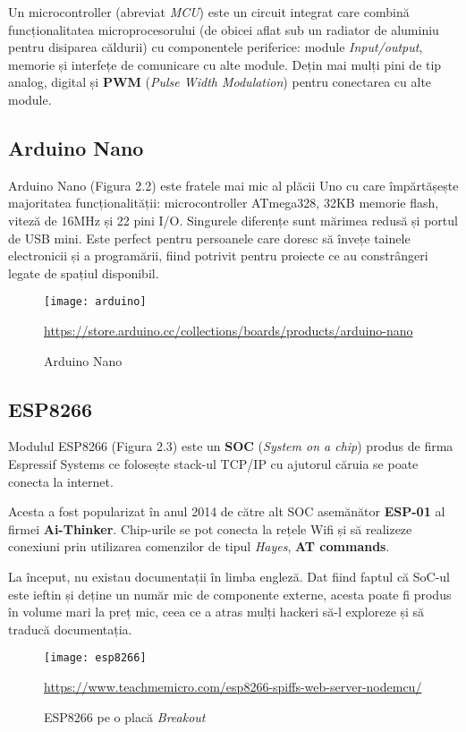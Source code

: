 Un microcontroller (abreviat \emph{MCU}) este un circuit integrat care combină funcționalitatea microprocesorului (de obicei aflat sub un radiator de aluminiu pentru disiparea căldurii) cu componentele periferice: module \emph{Input/output}, memorie și interfețe de comunicare cu alte module. Dețin mai mulți pini de tip analog, digital și \textbf{PWM} (\emph{Pulse Width Modulation}) pentru conectarea cu alte module.

\break

\subsection{Arduino Nano}

Arduino Nano (Figura 2.2) este fratele mai mic al plăcii Uno cu care împărtășește majoritatea funcționalității: microcontroller ATmega328, 32KB memorie flash, viteză de 16MHz și 22 pini I/O.  Singurele diferențe sunt mărimea redusă și portul de USB mini. Este perfect pentru persoanele care doresc să învețe tainele electronicii și a programării, fiind potrivit pentru proiecte ce au constrângeri legate de spațiul disponibil.

\begin{figure}[h]
	\centering
	\texttt{[image: arduino]}
	\caption{Arduino Nano}\url{https://store.arduino.cc/collections/boards/products/arduino-nano}
	\label{fig:arduino}
\end{figure}

\subsection{ESP8266}

Modulul ESP8266 (Figura 2.3) este un \textbf{SOC} (\emph{System on a chip}) produs de firma Espressif Systems ce folosește stack-ul TCP/IP cu ajutorul căruia se poate conecta la internet.

Acesta a fost popularizat în anul 2014 de către alt SOC asemănător \textbf{ESP-01} al firmei \textbf{Ai-Thinker}. Chip-urile se pot conecta la rețele Wifi și să realizeze conexiuni prin utilizarea comenzilor de tipul \emph{Hayes}, \textbf{AT commands}.

La început, nu existau documentații în limba engleză. Dat fiind faptul că SoC-ul este ieftin și deține un număr mic de componente externe, acesta poate fi produs în volume mari la preț mic, ceea ce a atras mulți hackeri să-l exploreze și să traducă documentația. 

\begin{figure}[h]
	\centering
	\texttt{[image: esp8266]}
	\caption{ESP8266 pe o placă \emph{Breakout}}\url{https://www.teachmemicro.com/esp8266-spiffs-web-server-nodemcu/}
	\label{fig:esp8266}
\end{figure}

